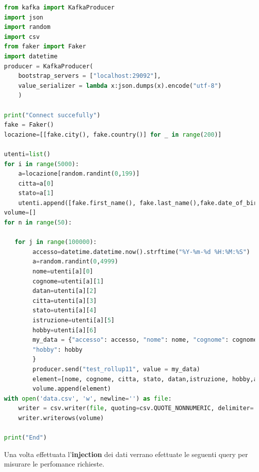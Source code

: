 \documentclass{article}
\begin{document}
\begin{lstlisting}[language=Python]
from kafka import KafkaProducer  
import json 
import random
import csv
from faker import Faker
import datetime
producer = KafkaProducer(  
    bootstrap_servers = ["localhost:29092"],  
    value_serializer = lambda x:json.dumps(x).encode("utf-8")  
    )  

print("Connect succefully") 
fake = Faker()
locazione=[[fake.city(), fake.country()] for _ in range(200)]

utenti=list()
for i in range(5000):
    a=locazione[random.randint(0,199)]
    citta=a[0]
    stato=a[1]
    utenti.append([fake.first_name(), fake.last_name(),fake.date_of_birth(minimum_age=18, maximum_age=89).strftime("%Y-%m-%d"), citta, stato, fake.random_element(elements=("Scuola Secondaria", "Laurea triennale", "Laurea Magistrale", "Dottorato")), fake.random_element(elements=("Leggere","Viaggiare","Giocare a calcio","Giocare ai videogiochi","Fare sport")) ] )
volume=[]
for n in range(50):
  
   for j in range(100000):
        accesso=datetime.datetime.now().strftime("%Y-%m-%d %H:%M:%S")
        a=random.randint(0,4999)
        nome=utenti[a][0]
        cognome=utenti[a][1]
        datan=utenti[a][2]
        citta=utenti[a][3]
        stato=utenti[a][4]
        istruzione=utenti[a][5]
        hobby=utenti[a][6]
        my_data = {"accesso": accesso, "nome": nome, "cognome": cognome, "datan":  datan, "citta": citta, "stato": stato, "istruzione": istruzione,
        "hobby": hobby
        }
        producer.send("test_rollup11", value = my_data) 
        element=[nome, cognome, citta, stato, datan,istruzione, hobby,accesso]
        volume.append(element)
with open('data.csv', 'w', newline='') as file:
    writer = csv.writer(file, quoting=csv.QUOTE_NONNUMERIC, delimiter=',')
    writer.writerows(volume) 

print("End")
\end{lstlisting}
Una volta effettuata l'\textbf{injection} dei dati  verrano efettuate le seguenti query per misurare le perfomance richieste.
\end{document}
